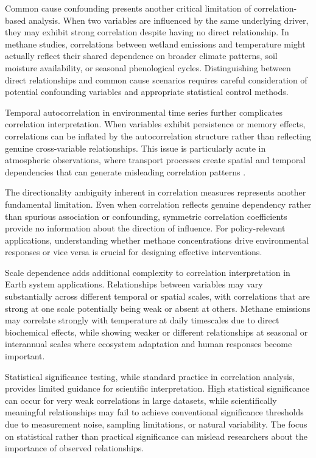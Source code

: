 Common cause confounding presents another critical limitation of correlation-based analysis. When two variables are influenced by the same underlying driver, they may exhibit strong correlation despite having no direct relationship. In methane studies, correlations between wetland emissions and temperature might actually reflect their shared dependence on broader climate patterns, soil moisture availability, or seasonal phenological cycles. Distinguishing between direct relationships and common cause scenarios requires careful consideration of potential confounding variables and appropriate statistical control methods.

Temporal autocorrelation in environmental time series further complicates correlation interpretation. When variables exhibit persistence or memory effects, correlations can be inflated by the autocorrelation structure rather than reflecting genuine cross-variable relationships. This issue is particularly acute in atmospheric observations, where transport processes create spatial and temporal dependencies that can generate misleading correlation patterns \cite{attanasio2013}.

The directionality ambiguity inherent in correlation measures represents another fundamental limitation. Even when correlation reflects genuine dependency rather than spurious association or confounding, symmetric correlation coefficients provide no information about the direction of influence. For policy-relevant applications, understanding whether methane concentrations drive environmental responses or vice versa is crucial for designing effective interventions.

Scale dependence adds additional complexity to correlation interpretation in Earth system applications. Relationships between variables may vary substantially across different temporal or spatial scales, with correlations that are strong at one scale potentially being weak or absent at others. Methane emissions may correlate strongly with temperature at daily timescales due to direct biochemical effects, while showing weaker or different relationships at seasonal or interannual scales where ecosystem adaptation and human responses become important.

Statistical significance testing, while standard practice in correlation analysis, provides limited guidance for scientific interpretation. High statistical significance can occur for very weak correlations in large datasets, while scientifically meaningful relationships may fail to achieve conventional significance thresholds due to measurement noise, sampling limitations, or natural variability. The focus on statistical rather than practical significance can mislead researchers about the importance of observed relationships.

